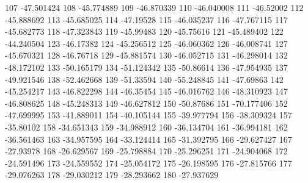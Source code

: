 107                      -47.501424
108                      -45.774889
109                      -46.870339
110                      -46.040008
111                       -46.52002
112                      -45.888692
113                      -45.685025
114                       -47.19528
115                      -46.035237
116                      -47.767115
117                      -45.682773
118                      -47.323843
119                       -45.99483
120                       -45.75616
121                      -45.489402
122                      -44.240504
123                       -46.17382
124                      -45.256512
125                      -46.060362
126                      -46.008741
127                      -45.670321
128                       -46.76718
129                      -45.881574
130                      -46.052715
131                      -46.298014
132                      -48.172102
133                      -50.165179
134                      -51.124342
135                       -50.86614
136                      -47.954935
137                      -49.921546
138                      -52.462668
139                       -51.33594
140                      -55.248845
141                       -47.69863
142                      -45.254217
143                      -46.822298
144                       -46.35454
145                      -46.016762
146                      -48.310923
147                      -46.808625
148                      -45.248313
149                      -46.627812
150                       -50.87686
151                      -70.177406
152                      -47.699995
153                      -41.889011
154                      -40.105144
155                      -39.977794
156                      -38.309324
157                       -35.80102
158                      -34.651343
159                      -34.988912
160                      -36.134704
161                      -36.994181
162                      -36.561463
163                      -34.957595
164                      -33.124414
165                      -31.392795
166                      -29.627427
167                       -27.93978
168                      -26.629567
169                      -25.798884
170                      -25.296251
171                      -24.904068
172                      -24.591496
173                      -24.559552
174                      -25.054172
175                      -26.198595
176                      -27.815766
177                      -29.076263
178                      -29.030212
179                      -28.293662
180                      -27.937629